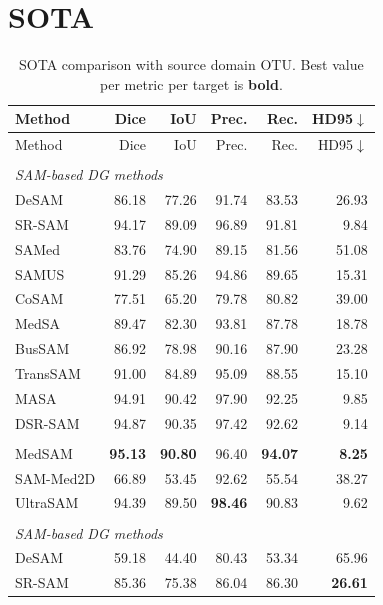 \documentclass[10pt]{article}
\begin{document}
\section{SOTA}
\label{sec:sota}

{\small
\begin{longtable}{lrrrrr}
\caption{SOTA comparison with source domain OTU. Best value per metric per target is \textbf{bold}.}
\label{tab:sota_otu}\\
\toprule
Method & Dice & IoU & Prec. & Rec. & HD95$\downarrow$ \\
\midrule
\endfirsthead
\toprule
Method & Dice & IoU & Prec. & Rec. & HD95$\downarrow$ \\
\midrule
\endhead
\endfoot
\bottomrule
\endlastfoot
\multicolumn{6}{l}{\textit{Target: OVATUS}} \\
\midrule
\multicolumn{6}{l}{\textit{SAM-based DG methods}} \\
DeSAM & 86.18 & 77.26 & 91.74 & 83.53 & 26.93 \\
SR-SAM & 94.17 & 89.09 & 96.89 & 91.81 & 9.84 \\
SAMed & 83.76 & 74.90 & 89.15 & 81.56 & 51.08 \\
SAMUS & 91.29 & 85.26 & 94.86 & 89.65 & 15.31 \\
CoSAM & 77.51 & 65.20 & 79.78 & 80.82 & 39.00 \\
MedSA & 89.47 & 82.30 & 93.81 & 87.78 & 18.78 \\
BusSAM & 86.92 & 78.98 & 90.16 & 87.90 & 23.28 \\
TransSAM & 91.00 & 84.89 & 95.09 & 88.55 & 15.10 \\
MASA & 94.91 & 90.42 & 97.90 & 92.25 & 9.85 \\
DSR-SAM & 94.87 & 90.35 & 97.42 & 92.62 & 9.14 \\
\addlinespace[2pt]
\multicolumn{6}{l}{\textit{Zero-shot foundation models}} \\
MedSAM & \textbf{95.13} & \textbf{90.80} & 96.40 & \textbf{94.07} & \textbf{8.25} \\
SAM-Med2D & 66.89 & 53.45 & 92.62 & 55.54 & 38.27 \\
UltraSAM & 94.39 & 89.50 & \textbf{98.46} & 90.83 & 9.62 \\
\addlinespace[4pt]
\multicolumn{6}{l}{\textit{Target: USOVA}} \\
\midrule
\multicolumn{6}{l}{\textit{SAM-based DG methods}} \\
DeSAM & 59.18 & 44.40 & 80.43 & 53.34 & 65.96 \\
SR-SAM & 85.36 & 75.38 & 86.04 & 86.30 & \textbf{26.61} \\

\end{longtable}}
\end{document}
